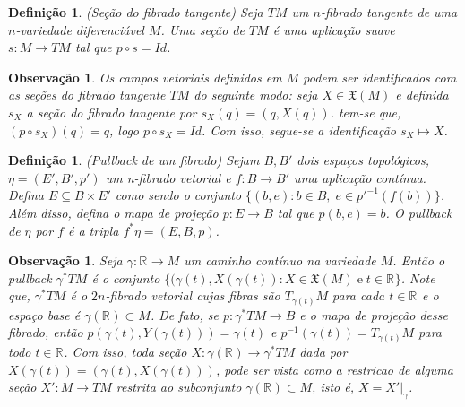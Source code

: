\documentclass[12pt]{book}
\newtheorem{definicao}[teorema]{Definição}
\newtheorem{observacao}[teorema]{Observação}
\newcommand{\campossuaves}[1]{\mathfrak{X}(#1)}
\newcommand{\espacotangenteponto}[2]{T_{#1}#2}
\newcommand{\pullbackfibradotangente}[2]{#1^{*}T#2}
\newcommand{\pullbackfibradotangenteM}[1]{\pullbackfibradotangente{#1}{M}}
\newcommand{\real}[1]{\mathbb{R}^{#1}}
\newcommand{\reta}{\real{}}
\begin{document}
	\begin{definicao}
		(Seção do fibrado tangente) Seja $TM$ um $n$-fibrado tangente de uma $n$-variedade diferenciável $M$. Uma seção de $TM$ é uma aplicação suave $s:M \to TM$ tal que $p\circ s=Id$.
	\end{definicao}
	
	\begin{observacao}\label{observacao_identificacao_secao_campo_vetorial}
		Os campos vetoriais definidos em $M$ podem ser identificados com as seções do fibrado tangente $TM$ do seguinte modo: seja $X\in \campossuaves{M}$ e definida $s_{X}$ a seção do fibrado tangente por $s_{X}(q) = (q, X(q))$. tem-se que, $(p\circ s_{X})(q) = q$, logo $p\circ s_{X}=Id$. Com isso, segue-se a identificação $s_{X} \mapsto X$.
	\end{observacao}
	
	\begin{definicao}
		(Pullback de um fibrado) Sejam $B, B'$ dois espaços topológicos, $\eta=(E', B', p')$ um n-fibrado vetorial e $f:B\to B'$ uma aplicação contínua. Defina $E \subseteq B\times E'$ como sendo o conjunto $\{(b, e): b \in B,\; e \in p'^{-1}(f(b)) \}$. Além disso, defina o mapa de projeção $p:E\to B$ tal que $p(b,e) = b$. O pullback de $\eta$ por $f$ é a tripla $f^{*}\eta = (E,B, p)$.
	\end{definicao}
	
	\begin{observacao}\label{observacao_pullback_fibrado_tangente}
		Seja $\gamma:\reta \to M$ um caminho contínuo na variedade $M$. Então o pullback $\pullbackfibradotangenteM{\gamma}$ é o conjunto $\{(\gamma(t), X(\gamma(t)): X\in \campossuaves{M} \; \text{e}\; t \in \reta \}$. Note que, $\pullbackfibradotangenteM{\gamma}$ é o $2n$-fibrado vetorial cujas fibras são $\espacotangenteponto{\gamma(t)}{M}$ para cada $t\in \reta$ e o espaço base é $\gamma(\reta)\subset M$. De fato, se $p: \pullbackfibradotangenteM{\gamma} \to B$ e o mapa de projeção desse fibrado, então $p(\gamma(t), Y(\gamma(t))) = \gamma(t)$ e $p^{-1}(\gamma(t)) = \espacotangenteponto{\gamma(t)}{M}$ para todo $t\in \reta$. Com isso, toda seção $X: \gamma(\reta)\to \pullbackfibradotangenteM{\gamma}$ dada por $X(\gamma(t)) = (\gamma(t), X(\gamma(t)))$, pode ser vista como a restricao de alguma seção $X': M\to TM$ restrita ao subconjunto $\gamma(\reta) \subset M$, isto é, $X= X'|_{\gamma}$.
	\end{observacao}
	
\end{document}
